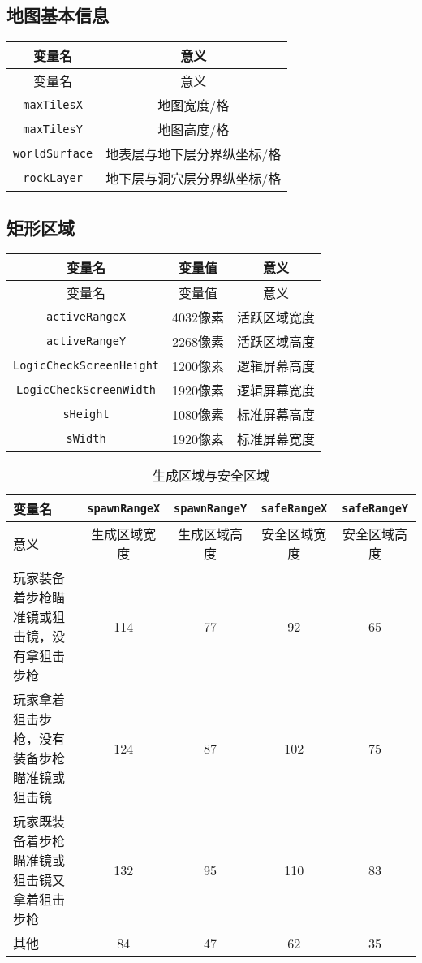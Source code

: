 \subsection{地图基本信息}
\begin{longtable}{|c|c|}
\hline \label{tab8}变量名&意义\\\hline
\endfirsthead
变量名&意义\\\hline
\endhead
\hline
\endfoot
{\lstinline!maxTilesX!}&地图宽度/格\\\hline
{\lstinline!maxTilesY!}&地图高度/格\\\hline
{\lstinline!worldSurface!}&地表层与地下层分界纵坐标/格\\\hline
{\lstinline!rockLayer!}&地下层与洞穴层分界纵坐标/格\\
\end{longtable}

\subsection{矩形区域}
\begin{longtable}{|c|c|c|}
\hline \label{tab9}变量名&变量值&意义\\\hline
\endfirsthead
变量名&变量值&意义\\\hline
\endhead
\hline
\endfoot
{\lstinline!activeRangeX!}&4032像素&活跃区域宽度\\\hline
{\lstinline!activeRangeY!}&2268像素&活跃区域高度\\\hline
{\lstinline!LogicCheckScreenHeight!}&1200像素&逻辑屏幕高度\\\hline
{\lstinline!LogicCheckScreenWidth!}&1920像素&逻辑屏幕宽度\\\hline
{\lstinline!sHeight!}&1080像素&标准屏幕高度\\\hline
{\lstinline!sWidth!}&1920像素&标准屏幕宽度\\
\end{longtable}

\begin{table}[!h]
    \centering
    \begin{tabular}{|p{}<{\centering}|c|c|c|c|}
         \hline 变量名&{\lstinline!spawnRangeX!}&{\lstinline!spawnRangeY!}&{\lstinline!safeRangeX!}&{\lstinline!safeRangeY!}  \\\hline
         意义&生成区域宽度&生成区域高度&安全区域宽度&安全区域高度\\\hline
         玩家装备着步枪瞄准镜或狙击镜，没有拿狙击步枪&114&77&92&65\\\hline
         玩家拿着狙击步枪，没有装备步枪瞄准镜或狙击镜&124&87&102&75\\\hline
         玩家既装备着步枪瞄准镜或狙击镜又拿着狙击步枪&132&95&110&83\\\hline
         其他&84&47&62&35\\\hline
    \end{tabular}
    \caption{生成区域与安全区域}
    \label{tab4618}
\end{table}

